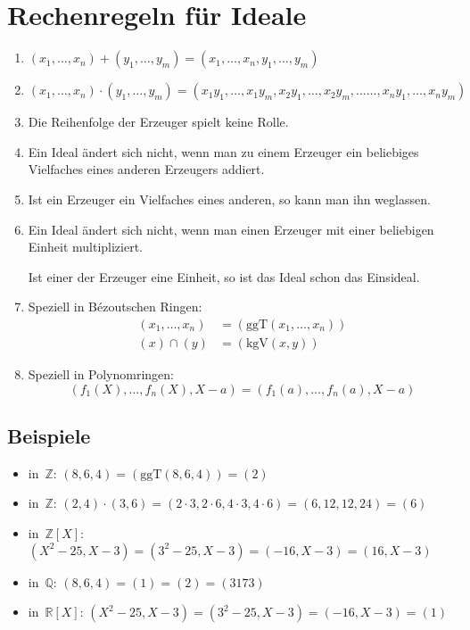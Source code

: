 \documentclass[12pt,a4paper,ngerman]{scrartcl}
\theoremstyle{definition}
\theoremstyle{plain}
\theoremstyle{remark}
\begin{document}
\section*{Rechenregeln für Ideale}

\begin{enumerate}
\item $(x_1,\ldots,x_n) + (y_1,\ldots,y_m) = (x_1,\ldots,x_n,y_1,\ldots,y_m)$
\item $(x_1,\ldots,x_n) \cdot (y_1,\ldots,y_m) = (x_1 y_1,\ldots,x_1 y_m,x_2
y_1,\ldots,x_2 y_m,\ldots\ldots,x_n y_1,\ldots,x_n y_m)$
\item Die Reihenfolge der Erzeuger spielt keine Rolle.
\item Ein Ideal ändert sich nicht, wenn man zu einem Erzeuger ein beliebiges
Vielfaches eines anderen Erzeugers addiert.
\item Ist ein Erzeuger ein Vielfaches eines anderen, so kann man ihn
weglassen.
\item Ein Ideal ändert sich nicht, wenn man einen Erzeuger mit einer beliebigen
Einheit multipliziert.

Ist einer der Erzeuger eine Einheit, so ist das Ideal schon das
Einsideal.
\item Speziell in Bézoutschen Ringen:
\begin{align*}
  (x_1,\ldots,x_n) &= (\mathrm{ggT}(x_1,\ldots,x_n)) \\
  (x) \cap (y) &= (\mathrm{kgV}(x,y))
\end{align*}
\item Speziell in Polynomringen:
\[ (f_1(X),\ldots,f_n(X),X-a) =
(f_1(a),\ldots,f_n(a),X-a) \]
\end{enumerate}

\subsection*{Beispiele}

\begin{itemize}
\item in~$\mathbb{Z}$: $(8,6,4) = (\mathrm{ggT}(8,6,4)) = (2)$
\item in~$\mathbb{Z}$: $(2,4) \cdot (3,6) = (2\cdot3,2\cdot6,4\cdot3,4\cdot6) =
(6,12,12,24) = (6)$
\item in~$\mathbb{Z}[X]$: $(X^2-25, X-3) = (3^2-25, X-3) = (-16, X-3) =
(16,X-3)$
\item in~$\mathbb{Q}$: $(8,6,4) = (1) = (2) = (3173)$
\item in~$\mathbb{R}[X]$: $(X^2-25, X-3) = (3^2-25, X-3) = (-16, X-3) = (1)$
\end{itemize}
\end{document}
